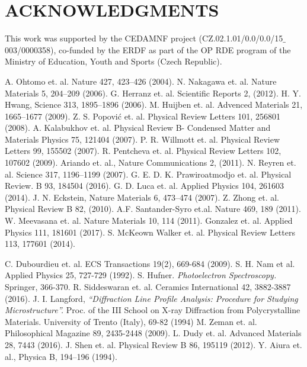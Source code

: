 \documentclass{aip-cp}
\begin{document}
\section{ACKNOWLEDGMENTS}
This work was supported
by the CEDAMNF project (CZ.02.1.01/0.0/0.0/15$\_$003/0000358), co-funded
by the ERDF as part of the OP RDE program of the Ministry of Education,
Youth and Sports (Czech Republic).
\begin{thebibliography}{28}
	A. Ohtomo et. al. Nature 427, 423–426 (2004).
	N. Nakagawa et. al. Nature Materials 5, 204–209 (2006).
	G. Herranz et. al. Scientific Reports 2, (2012).
	H. Y. Hwang, Science 313, 1895–1896 (2006).
	M. Huijben et. al. Advenced Materials 21, 1665–1677 (2009).
	Z. S. Popović et. al. Physical Review Letters 101, 256801 (2008).
	A. Kalabukhov et. al. Physical Review B- Condensed Matter and Materials Physics 75, 121404 (2007).
	P. R. Willmott et. al. Physical Review Letters 99, 155502 (2007).
	R. Pentcheva et. al. Physical Review Letters 102, 107602 (2009).
	Ariando et. al., Nature Communications 2, (2011).
	N. Reyren et. al. Science 317, 1196–1199 (2007).
	G. E. D. K. Prawiroatmodjo et. al. Physical Review. B 93, 184504 (2016).
	 G. D. Luca et. al. Applied Physics 104, 261603 (2014).
	J. N. Eckstein, Nature Materials 6, 473–474 (2007).
	Z. Zhong et. al. Physical Review B 82, (2010).
	A.F. Santander-Syro et.al. Nature 469, 189 (2011).
	W. Meevasana et. al. Nature Materials 10, 114 (2011).
	Gonzalez et. al. Applied Physics 111, 181601 (2017).
	S. McKeown Walker et. al. Physical Review Letters 113, 177601 (2014).
	
C. Dubourdieu et. al. ECS Transactions 19(2), 669-684 (2009).
S. H. Nam et al. Applied Physics 25, 727-729 (1992).
S. Hufner.
\textit{Photoelectron Spectroscopy.}
Springer, 366-370.
R. Siddeswaran et. al. Ceramics International 42, 3882-3887 (2016).
J. I. Langford,
\textit{“Diffraction Line Profile Analysis: Procedure for Studying Microstructure”.} Proc. of the III School on X-ray Diffraction from Polycrystalline Materials.
University of Trento (Italy), 69-82 (1994)
M. Zeman et. al. Philosophical Magazine 89, 2435-2448 (2009).
L. Dudy et. al. Advanced Materials 28, 7443 (2016).
J. Shen et. al. Physical Review B 86, 195119 (2012).
Y. Aiura et. al., Physica  B, 194–196 (1994).
\end{thebibliography}
\end{document}
